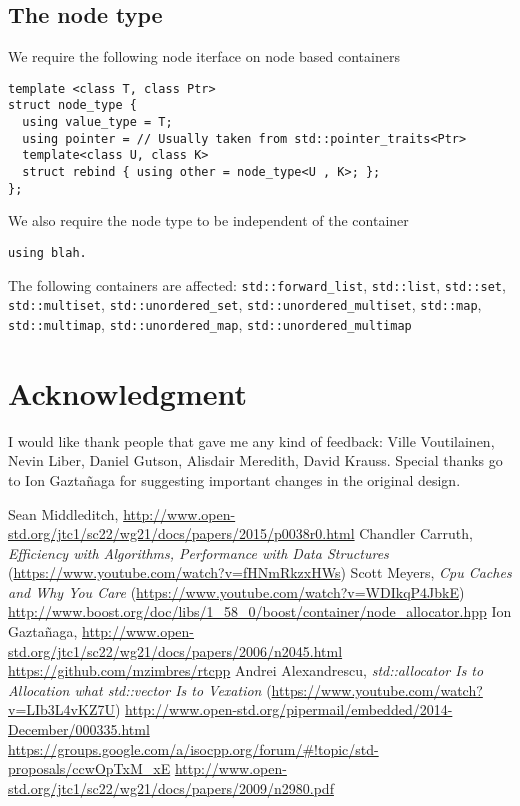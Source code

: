 \documentclass[11pt]{article}
\begin{document}
\subsection{The node type}

We require the following node iterface on node based containers

\medskip
\begin{lstlisting}
template <class T, class Ptr>
struct node_type {
  using value_type = T;
  using pointer = // Usually taken from std::pointer_traits<Ptr>
  template<class U, class K>
  struct rebind { using other = node_type<U , K>; };
};
\end{lstlisting}

We also require the node type to be independent of the container

\medskip
\begin{lstlisting}
using blah.
\end{lstlisting}

The following containers are affected: \texttt{std::forward\_list},
\texttt{std::list}, \texttt{std::set}, \texttt{std::multiset},
\texttt{std::unordered\_set}, \texttt{std::unordered\_multiset},
\texttt{std::map}, \texttt{std::multimap},
\texttt{std::unordered\_map}, \texttt{std::unordered\_multimap}

\section{Acknowledgment}

I would like thank people that gave me any kind of feedback: Ville Voutilainen,
Nevin Liber, Daniel Gutson, Alisdair Meredith, David Krauss. Special thanks go
to Ion Gaztañaga for suggesting important changes in the original design.

\begin{thebibliography}{9}

   Sean Middleditch, \url{http://www.open-std.org/jtc1/sc22/wg21/docs/papers/2015/p0038r0.html}
   Chandler Carruth, {\it Efficiency with Algorithms, Performance
  with Data Structures} (\url{https://www.youtube.com/watch?v=fHNmRkzxHWs})
   Scott Meyers, {\it Cpu Caches and Why You Care} (\url{https://www.youtube.com/watch?v=WDIkqP4JbkE})
   \url{http://www.boost.org/doc/libs/1_58_0/boost/container/node_allocator.hpp}
   Ion Gazta\~ naga, \url{http://www.open-std.org/jtc1/sc22/wg21/docs/papers/2006/n2045.html}
   \url{https://github.com/mzimbres/rtcpp}
   Andrei Alexandrescu, {\it std::allocator Is to Allocation what
  std::vector Is to Vexation} (\url{https://www.youtube.com/watch?v=LIb3L4vKZ7U})
   \url{http://www.open-std.org/pipermail/embedded/2014-December/000335.html}
   \url{https://groups.google.com/a/isocpp.org/forum/#!topic/std-proposals/ccwOpTxM_xE}
   \url{http://www.open-std.org/jtc1/sc22/wg21/docs/papers/2009/n2980.pdf}

\end{thebibliography}
\end{document}
